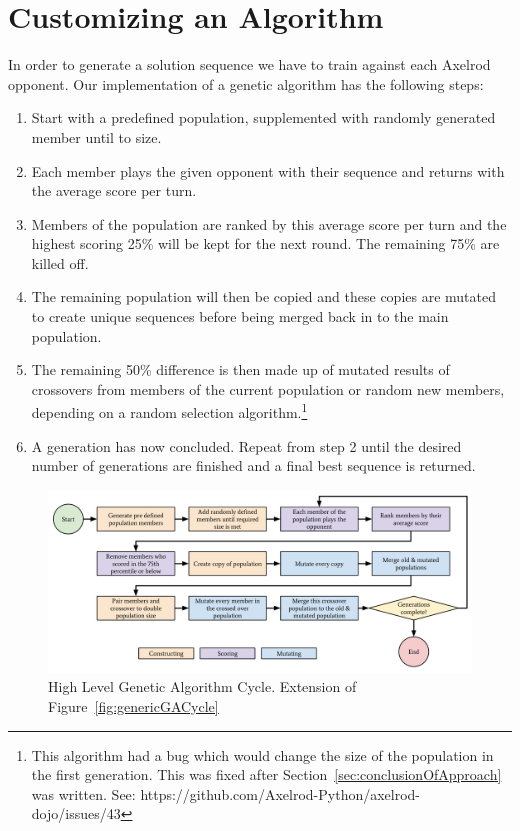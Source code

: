 \section{Customizing an Algorithm}\label{sec:buildingTheAlgorithm}
In order to generate a solution sequence we have to train against each Axelrod opponent.
Our implementation of a genetic algorithm has the following steps:
\begin{enumerate}
    \item Start with a predefined population, supplemented with randomly generated member until to size.
    \item Each member plays the given opponent with their sequence and returns with the average score per turn.
    \item Members of the population are ranked by this average score per turn and the highest scoring 25\% will be kept for the next round.
    The remaining 75\% are killed off.
    \item The remaining population will then be copied and these copies are mutated to create unique sequences before being merged back in to the main population.
    \item The remaining 50\% difference is then made up of mutated results of crossovers from members of the current population or random new members, depending on a random selection algorithm.\footnote{This algorithm had a bug which would change the size of the population in the first generation.
    This was fixed after Section~\ref{sec:conclusionOfApproach} was written.
    See: https://github.com/Axelrod-Python/axelrod-dojo/issues/43}
    \item A generation has now concluded.
    Repeat from step 2 until the desired number of generations are finished and a final best sequence is returned.
\end{enumerate}

\begin{figure}[ht]
    \includegraphics[width=1.0\textwidth, center]{./img/flows/custom_ga_cycle}
    \caption{High Level Genetic Algorithm Cycle. Extension of Figure~\ref{fig:genericGACycle}}\label{fig:customGAcycle}
\end{figure}

